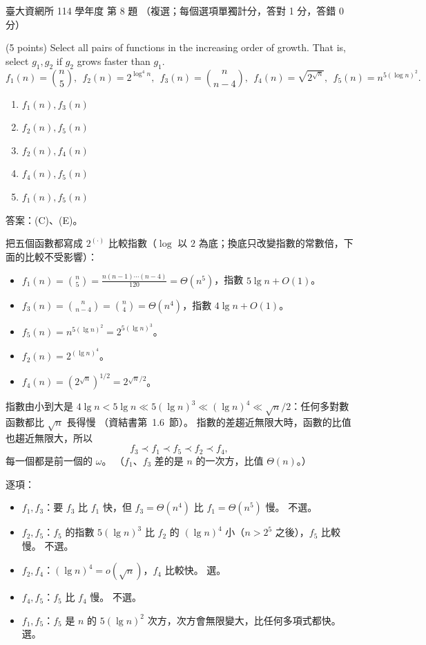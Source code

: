 \begin{pastexam}[label={px:ntu-114-dsa-08}]{臺大資網所 114 學年度 第 8 題}
（複選；每個選項單獨計分，答對 1 分，答錯 0 分）

(5 points) Select all pairs of functions in the increasing order of growth. That is, select $g_1,g_2$ if $g_2$
grows faster than $g_1$.
\[f_1(n)=\binom{n}{5},\ \ f_2(n)=2^{\log^4 n},\ \ f_3(n)=\binom{n}{n-4},\ \ f_4(n)=\sqrt{2^{\sqrt{n}}},\ \
f_5(n)=n^{5(\log n)^2}.\]
\begin{enumerate}[label=(\Alph*)]
\item $f_1(n),f_3(n)$
\item $f_2(n),f_5(n)$
\item $f_2(n),f_4(n)$
\item $f_4(n),f_5(n)$
\item $f_1(n),f_5(n)$
\end{enumerate}
\end{pastexam}

\begin{pastsoln}
答案：(C)、(E)。

把五個函數都寫成 $2^{(\cdot)}$ 比較指數（$\log$ 以 $2$ 為底；換底只改變指數的常數倍，下面的比較不受影響）：
\begin{itemize}
\item $f_1(n) = \binom{n}{5} = \frac{n(n-1)\cdots(n-4)}{120} = \Theta(n^5)$，指數 $5\lg n + O(1)$。
\item $f_3(n) = \binom{n}{n-4} = \binom{n}{4} = \Theta(n^4)$，指數 $4\lg n + O(1)$。
\item $f_5(n) = n^{5(\lg n)^2} = 2^{5(\lg n)^3}$。
\item $f_2(n) = 2^{(\lg n)^4}$。
\item $f_4(n) = (2^{\sqrt{n}})^{1/2} = 2^{\sqrt{n}/2}$。
\end{itemize}
指數由小到大是 $4\lg n < 5\lg n \ll 5(\lg n)^3 \ll (\lg n)^4 \ll \sqrt{n}/2$：任何多對數函數都比 $\sqrt{n}$ 長得慢
（資結書第~1.6~節）。 指數的差趨近無限大時，函數的比值也趨近無限大，所以
\[
f_3 \prec f_1 \prec f_5 \prec f_2 \prec f_4 ,
\]
每一個都是前一個的 $\omega$。 （$f_1$、$f_3$ 差的是 $n$ 的一次方，比值 $\Theta(n)$。）

逐項：
\begin{itemize}
\item[(A)] $f_1, f_3$：要 $f_3$ 比 $f_1$ 快，但 $f_3 = \Theta(n^4)$ 比 $f_1 = \Theta(n^5)$ 慢。 不選。
\item[(B)] $f_2, f_5$：$f_5$ 的指數 $5(\lg n)^3$ 比 $f_2$ 的 $(\lg n)^4$ 小（$n > 2^5$ 之後），$f_5$ 比較慢。 不選。
\item[(C)] $f_2, f_4$：$(\lg n)^4 = o(\sqrt{n})$，$f_4$ 比較快。 選。
\item[(D)] $f_4, f_5$：$f_5$ 比 $f_4$ 慢。 不選。
\item[(E)] $f_1, f_5$：$f_5$ 是 $n$ 的 $5(\lg n)^2$ 次方，次方會無限變大，比任何多項式都快。 選。
\end{itemize}
\end{pastsoln}
